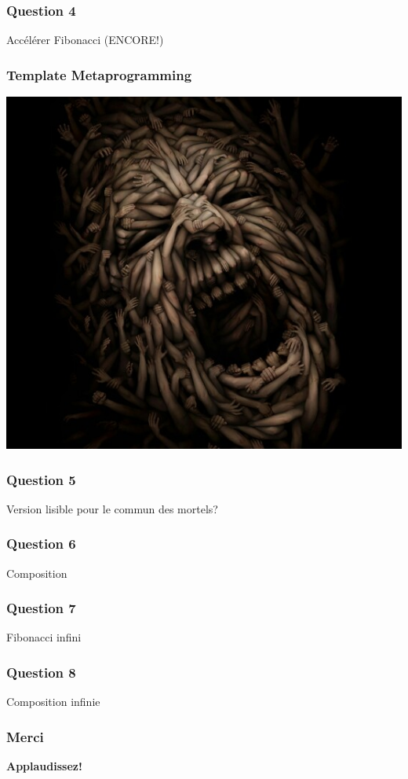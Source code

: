 \documentclass{beamer}
\begin{document}
\begin{frame}
\frametitle{Question 4}
\begin{center}
\Huge{Accélérer Fibonacci (ENCORE!)}
\end{center}
\end{frame}

\begin{frame}
\frametitle{Template Metaprogramming}
\begin{center}
\includegraphics[scale=0.4]{TMP.jpg}
\end{center}
\end{frame}

\begin{frame}
\frametitle{Question 5}
\begin{center}
\Huge{Version lisible pour le commun des mortels?}
\end{center}
\end{frame}

\begin{frame}
\frametitle{Question 6}
\begin{center}
\Huge{Composition}
\end{center}
\end{frame}

\begin{frame}
\frametitle{Question 7}
\begin{center}
\Huge{Fibonacci infini}
\end{center}
\end{frame}

\begin{frame}
\frametitle{Question 8}
\begin{center}
\Huge{Composition infinie}
\end{center}
\end{frame}

\begin{frame}
\frametitle{Merci}
\begin{center}
\Huge{\textbf{Applaudissez!}}
\end{center}
\end{frame}
\end{document}
